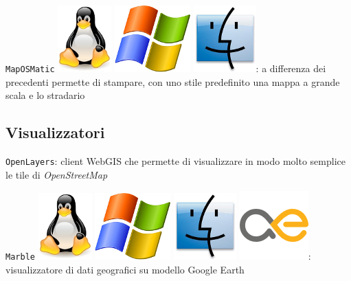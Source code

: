 \documentclass[a4paper,twoside,12pt,]{article}
\newcommand{\osm}{\emph{OpenStreetMap}\xspace}
\newcommand{\soft}[1]{\texttt{#1}}
\begin{document}
\soft{MapOSMatic} \includegraphics{./linux-logo.jpg} \includegraphics{./windows-logo.jpg} \includegraphics{./mac-logo.jpg}: a differenza dei precedenti permette di stampare, con uno stile predefinito una mappa a grande scala e lo stradario 

\subsection{Visualizzatori}

\soft{OpenLayers}: client WebGIS che permette di visualizzare in modo molto semplice le tile di \osm

\soft{Marble} \includegraphics{./linux-logo.jpg} \includegraphics{./windows-logo.jpg} \includegraphics{./mac-logo.jpg} \includegraphics{./maemo-logo.png}: visualizzatore di dati geografici su modello Google Earth 
\end{document}
